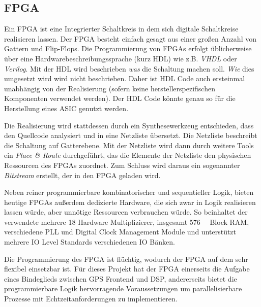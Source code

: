 
\subsection{FPGA}
Ein FPGA ist eine Integrierter Schaltkreis in dem sich digitale Schaltkreise realisieren lassen. Der FPGA besteht einfach gesagt aus einer großen Anzahl von Gattern und Flip-Flops. Die Programmierung von FPGAs erfolgt üblicherweise über eine Hardwarebeschreibungssprache (kurz HDL) wie z.B. \emph{VHDL} oder \emph{Verilog}. Mit der HDL wird beschrieben \emph{was} die Schaltung machen soll. \emph{Wie} dies umgesetzt wird wird nicht beschrieben. Daher ist HDL Code auch ersteinmal unabhängig von der Realisierung (sofern keine herstellerspezifischen Komponenten verwendet werden). Der HDL Code könnte genau so für die Herstellung eines ASIC genutzt werden.

Die Realisierung wird stattdessen durch ein Synthesewerkzeug entschieden, dass den Quellcode analysiert und in eine Netzliste übersetzt. Die Netzliste beschreibt die Schaltung auf Gatterebene. Mit der Netzliste wird dann durch weitere Tools ein \emph{Place \& Route} durchgeführt, das die Elemente der Netzliste den physischen Ressourcen des FPGAs zuordnet. Zum Schluss wird daraus ein sogenannter \emph{Bitstream} erstellt, der in den FPGA geladen wird.

Neben reiner programmierbare kombinatorischer und sequentieller Logik, bieten heutige FPGAs außerdem dedizierte Hardware, die sich zwar in Logik realisieren lassen würde, aber unnötige Ressourcen verbrauchen würde. So beinhaltet der verwendete \comfpga mehrere \SI{18}{\bit} Hardware Multiplizierer, insgesamt \SI{576}{\kilo\bit} Block RAM, verschiedene PLL und Digital Clock Management Module und unterstützt mehrere IO Level Standards verschiedenen IO Bänken.

Die Programmierung des FPGA ist flüchtig, wodurch der FPGA auf dem \comboard sehr flexibel einsetzbar ist. Für dieses Projekt hat der FPGA einerseits die Aufgabe eines Bindeglieds zwischen GPS Frontend und DSP, andererseits bietet die programmierbare Logik hervorragende Voraussetzungen um parallelisierbare Prozesse mit Echtzeitanforderungen zu implementieren.